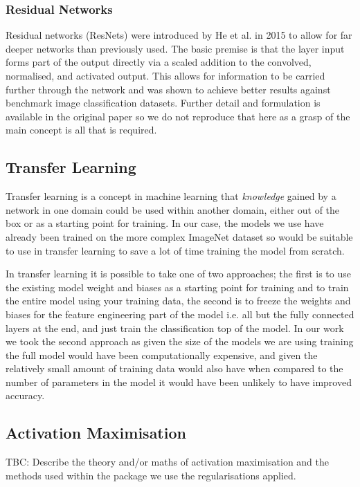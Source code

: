 \documentclass[12pt]{article}
\numberwithin{equation}{section}
\numberwithin{figure}{section}
\begin{document}
\subsubsection{Residual Networks}
Residual networks (ResNets) were introduced by He et al. in 2015\cite{He2015a} to allow for far deeper networks than previously used. The basic premise is that the layer input forms part of the output directly via a scaled addition to the convolved, normalised, and activated output. This allows for information to be carried further through the network and was shown to achieve better results against benchmark image classification datasets. Further detail and formulation is available in the original paper so we do not reproduce that here as a grasp of the main concept is all that is required.

\subsection{Transfer Learning} 
\label{sub:Transfer_Learning} 
Transfer learning is a concept in machine learning that \emph{knowledge} gained by a network in one domain could be used within another domain, either out of the box or as a starting point for training. In our case, the models we use have already been trained on the more complex ImageNet dataset so would be suitable to use in transfer learning to save a lot of time training the model from scratch.


In transfer learning it is possible to take one of two approaches; the first is to use the existing model weight and biases as a starting point for training and to train the entire model using your training data, the second is to freeze the weights and biases for the feature engineering part of the model i.e. all but the fully connected layers at the end, and just train the classification top of the model. In our work we took the second approach as given the size of the models we are using training the full model would have been computationally expensive, and given the relatively small amount of training data would also have when compared to the number of parameters in the model it would have been unlikely to have improved accuracy.

\subsection{Activation Maximisation} 
\label{sub:Activation_Maximisation} 
TBC: Describe the theory and/or maths of activation maximisation and the methods used within the package we use the regularisations applied. 
\end{document}
